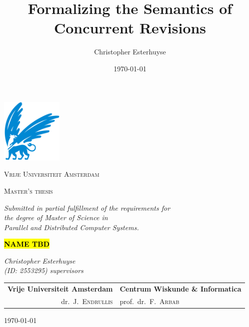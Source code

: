 \documentclass[11pt]{report}
\title{Formalizing the Semantics of Concurrent Revisions}
\author{Christopher Esterhuyse}
\date{\today}
\begin{document}

\begin{titlepage}
	\centering
	\includegraphics[width=0.22\textwidth, trim={0 0.15cm 0 0}, clip]{img/vu.png}
	\par
	{\scshape\huge Vrije Universiteit Amsterdam \par}
	\vspace{1.5cm}
	{\scshape\LARGE Master's thesis\par \par
	\vspace{0.2cm}
	\small \textit{Submitted in partial fulfillment of the requirements for\\ the degree of Master of Science in\\ Parallel and Distributed Computer Systems.}\par}
	\vspace{1.5cm}
	{\Huge\bfseries \rm \textbf{\hl{NAME TBD}}\par}
	\vspace{1.5cm}
	{\Large\itshape\rm \noindent\textit{Christopher Esterhuyse}\\}
	\vspace{1mm}
	\textit{(ID: 2553295)}
	\vfill
		\rm \noindent \textit{supervisors} \\ \vspace{0.15cm}
	\begin{tabular}{r@{\hskip 0.4in}l}
\rm \hspace{3mm} \textbf{Vrije Universiteit Amsterdam} & \textbf{Centrum Wiskunde \& Informatica} \\ 
dr.\ J.\ \textsc{Endrullis} & prof.\ dr.\ F.\ \textsc{Arbab}
\end{tabular}

	\vfill

	{\large \today\par}
\end{titlepage}
\end{document}

